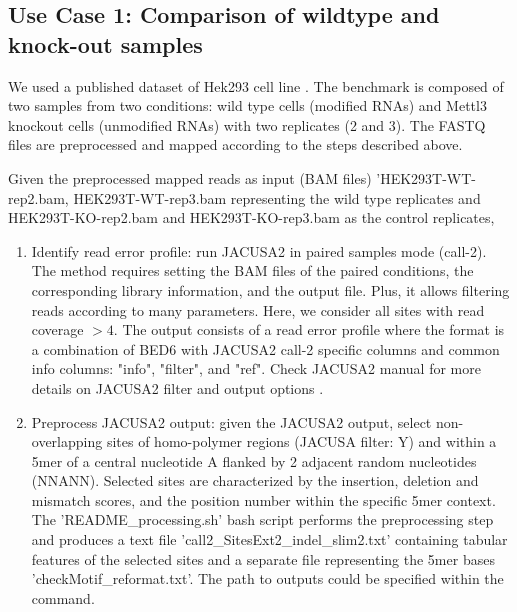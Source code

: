 \documentclass[times, 11pt, a4paper]{article}
\begin{document}
\subsection*{Use Case 1: Comparison of wildtype and knock-out samples}
We used a published dataset of Hek293 cell line \cite{pratanwanich2021identification}. The benchmark is composed of two samples from two conditions: wild type cells (modified RNAs) and Mettl3 knockout cells (unmodified RNAs) with two replicates (2 and 3). The FASTQ files are preprocessed and mapped according to the steps described above.
 
Given the preprocessed mapped reads as input (BAM files) 'HEK293T-WT-rep2.bam, HEK293T-WT-rep3.bam representing the wild type replicates and HEK293T-KO-rep2.bam and  HEK293T-KO-rep3.bam as the control replicates, 
\begin{enumerate} 
	\item Identify read error profile: run JACUSA2 in paired samples mode (call-2). The method requires setting the BAM files of the paired conditions, the corresponding library information, and the output file. Plus, it allows filtering reads according to many parameters. Here, we consider all sites with read coverage $> 4$. The output consists of a read error profile where the format is a combination of BED6 with JACUSA2 call-2 specific columns and common info columns: "info", "filter", and "ref". Check JACUSA2 manual for more details on JACUSA2 filter and output options \cite{JACUSA2manual}.
	\item Preprocess JACUSA2 output: given the JACUSA2 output, select non-overlapping sites of homo-polymer regions (JACUSA filter: Y) and within a 5mer of a central nucleotide A flanked by 2 adjacent random nucleotides (NNANN). Selected sites are characterized by the insertion, deletion and mismatch scores, and the position number within the specific 5mer context. The 'README\_processing.sh' bash script performs the preprocessing step and produces a text file 'call2\_SitesExt2\_indel\_slim2.txt' containing tabular features of the selected sites and a separate file representing the 5mer bases 'checkMotif\_reformat.txt'. The path to outputs could be specified within the command.
	\begin{spverbatim} 

\end{spverbatim}
\end{enumerate}
\end{document}
